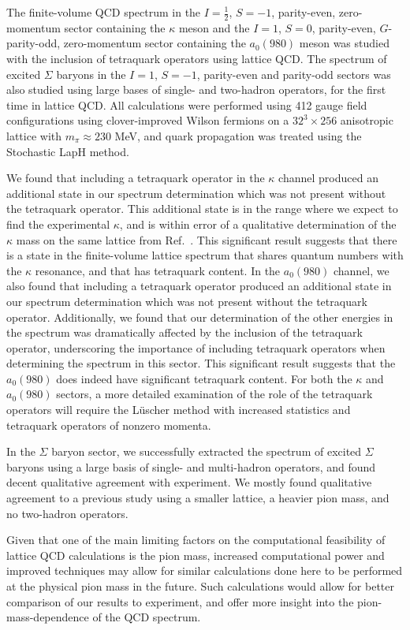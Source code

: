 The finite-volume QCD spectrum in the $I=\frac{1}{2}$, $S=-1$, parity-even, zero-momentum sector containing the $\kappa$ meson and the $I=1$, $S=0$, parity-even, $G$-parity-odd, zero-momentum sector containing the $a_0(980)$ meson was studied with the inclusion of tetraquark operators using lattice QCD. The spectrum of excited $\Sigma$ baryons in the $I=1$, $S=-1$, parity-even and parity-odd sectors was also studied using large bases of single- and two-hadron operators, for the first time in lattice QCD. All calculations were performed using 412 gauge field configurations using clover-improved Wilson fermions on a $32^3\times 256$ anisotropic lattice with $m_\pi \approx 230$ MeV, and quark propagation was treated using the Stochastic LapH method.

We found that including a tetraquark operator in the $\kappa$ channel produced an additional state in our spectrum determination which was not present without the tetraquark operator. This additional state is in the range where we expect to find the experimental $\kappa$, and is within error of a qualitative determination of the $\kappa$ mass on the same lattice from Ref.~\cite{Brett:2018jqw}. This significant result suggests that there is a state in the finite-volume lattice spectrum that shares quantum numbers with the $\kappa$ resonance, and that has tetraquark content. In the $a_0(980)$ channel, we also found that including a tetraquark operator produced an additional state in our spectrum determination which was not present without the tetraquark operator. Additionally, we found that our determination of the other energies in the spectrum was dramatically affected by the inclusion of the tetraquark operator, underscoring the importance of including tetraquark operators when determining the spectrum in this sector. This significant result suggests that the $a_0(980)$ does indeed have significant tetraquark content. For both the $\kappa$ and $a_0(980)$ sectors, a more detailed examination of the role of the tetraquark operators will require the L\"uscher method with increased statistics and tetraquark operators of nonzero momenta.

In the $\Sigma$ baryon sector, we successfully extracted the spectrum of excited $\Sigma$ baryons using a large basis of single- and multi-hadron operators, and found decent qualitative agreement with experiment. We mostly found qualitative agreement to a previous study using a smaller lattice, a heavier pion mass, and no two-hadron operators.

Given that one of the main limiting factors on the computational feasibility of lattice QCD calculations is the pion mass, increased computational power and improved techniques may allow for similar calculations done here to be performed at the physical pion mass in the future. Such calculations would allow for better comparison of our results to experiment, and offer more insight into the pion-mass-dependence of the QCD spectrum.